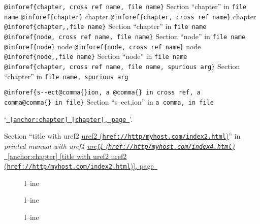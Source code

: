 \documentclass{book}
\renewcommand{\_}{\Texinfounderscore\discretionary{}{}{}}
\begin{document}
\begin{titlepage}
\texttt{@inforef\{chapter,\ cross ref name,\ file name\}} Section ``chapter'' in \texttt{file name}
\texttt{@inforef\{chapter\}} chapter
\texttt{@inforef\{chapter,\ cross ref name\}} chapter
\texttt{@inforef\{chapter{,}{,}file name\}} Section ``chapter'' in \texttt{file name}
\texttt{@inforef\{node,\ cross ref name,\ file name\}} Section ``node'' in \texttt{file name}
\texttt{@inforef\{node\}} node
\texttt{@inforef\{node,\ cross ref name\}} node
\texttt{@inforef\{node{,}{,}file name\}} Section ``node'' in \texttt{file name}
\texttt{@inforef\{chapter,\ cross ref name,\ file name,\ spurious arg\}} Section ``chapter'' in \texttt{file name,\ spurious arg}

\texttt{@inforef\{s{-}{-}ect@comma\{\}ion,\ a @comma\{\}\ in cross
ref,\ a comma@comma\{\}\ in file\}}
Section ``s--ect,ion'' in \texttt{a comma,\ in file}

`\texttt{\hyperref[anchor:chapter]{\chaptername~\ref*{anchor:chapter} [chapter], page~\pageref*{anchor:chapter}}}'.

Section ``title with uref2 \href{href://http/myhost.com/index2.html}{uref2 (\nolinkurl{href://http/myhost.com/index2.html})}'' in \textsl{printed manual with uref4 \href{href://http/myhost.com/index4.html}{uref4 (\nolinkurl{href://http/myhost.com/index4.html})}}
\hyperref[anchor:chapter]{\chaptername~\ref*{anchor:chapter} [title with uref2 \href{href://http/myhost.com/index2.html}{uref2 (\nolinkurl{href://http/myhost.com/index2.html})}], page~\pageref*{anchor:chapter}}

\begin{description}
\item[{\parbox[b]{\linewidth}{%
\textbf{a--strong}}}]
l--ine
\end{description}

\begin{description}
\item[{\parbox[b]{\linewidth}{%
a--asis\\
\index[cp]{a--asis@\texttt{a{-}{-}asis}}%
b
\index[cp]{b@\texttt{b}}%
}}]
l--ine
\end{description}

\begin{description}
\item[{\parbox[b]{\linewidth}{%
\emph{a}\\
\index[fn]{a@\texttt{a}}%
\index[cp]{index entry between item and itemx@index entry between item and itemx}%
\emph{b}
\index[fn]{b@\texttt{b}}%
}}]
l--ine
\end{description}


\end{titlepage}
\end{document}

